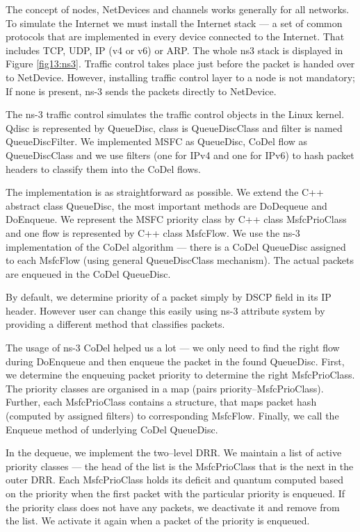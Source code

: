 The concept of nodes, NetDevices and channels works generally for all networks. To simulate the Internet we must install the Internet stack --- a set of common protocols that are implemented in every device connected to the Internet. That includes TCP, UDP, IP (v4 or v6) or ARP. The whole ns3 stack is displayed in Figure \ref{fig13:ns3}. Traffic control takes place just before the packet is handed over to NetDevice. However, installing traffic control layer to a node is not mandatory; If none is present, ns-3 sends the packets directly to NetDevice.

The ns-3 traffic control simulates the traffic control objects in the Linux kernel. Qdisc is represented by QueueDisc, class is QueueDiscClass and filter is named QueueDiscFilter. We implemented MSFC as QueueDisc, CoDel flow as QueueDiscClass and we use filters (one for IPv4 and one for IPv6) to hash packet headers to classify them into the CoDel flows.


The implementation is as straightforward as possible. We extend the C++ abstract class QueueDisc, the most important methods are DoDequeue and DoEnqueue. We represent the MSFC priority class by C++ class MsfcPrioClass and one flow is represented by C++ class MsfcFlow. We use the ns-3 implementation of the CoDel algorithm --- there is a CoDel QueueDisc assigned to each MsfcFlow (using general QueueDiscClass mechanism). The actual packets are enqueued in the CoDel QueueDisc.

By default, we determine priority of a packet simply by DSCP field in its IP header. However user can change this easily using ns-3 attribute system by providing a different method that classifies packets. 

The usage of ns-3 CoDel helped us a lot --- we only need to find the right flow during DoEnqueue and then enqueue the packet in the found QueueDisc. First, we determine the enqueuing packet priority to determine the right MsfcPrioClass. The priority classes are organised in a map (pairs priority--MsfcPrioClass). Further, each MsfcPrioClass contains a structure, that maps packet hash (computed by assigned filters) to corresponding MsfcFlow. Finally, we call the Enqueue method of underlying CoDel QueueDisc.

In the dequeue, we implement the two--level DRR. We maintain a list of active priority classes --- the head of the list is the MsfcPrioClass that is the next in the outer DRR. Each MsfcPrioClass holds its deficit and quantum computed based on the priority when the first packet with the particular priority is enqueued. If the priority class does not have any packets, we deactivate it and remove from the list. We activate it again when a packet of the priority is enqueued.  

